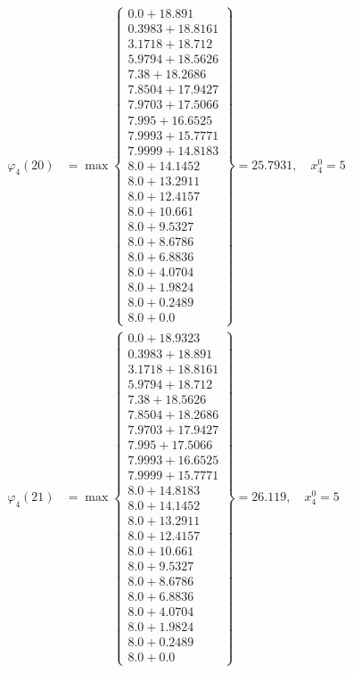\documentclass{article}
\begin{document}
\begin{align*}
\varphi_{4}(20) &= \max \left\{ \begin{array}{c}
0.0 + 18.891 \\
 0.3983 + 18.8161 \\
 3.1718 + 18.712 \\
 5.9794 + 18.5626 \\
 7.38 + 18.2686 \\
 7.8504 + 17.9427 \\
 7.9703 + 17.5066 \\
 7.995 + 16.6525 \\
 7.9993 + 15.7771 \\
 7.9999 + 14.8183 \\
 8.0 + 14.1452 \\
 8.0 + 13.2911 \\
 8.0 + 12.4157 \\
 8.0 + 10.661 \\
 8.0 + 9.5327 \\
 8.0 + 8.6786 \\
 8.0 + 6.8836 \\
 8.0 + 4.0704 \\
 8.0 + 1.9824 \\
 8.0 + 0.2489 \\
 8.0 + 0.0
\end{array} \right\}=25.7931, \quad x_{4}^0=5\\
  
\varphi_{4}(21) &= \max \left\{ \begin{array}{c}
0.0 + 18.9323 \\
 0.3983 + 18.891 \\
 3.1718 + 18.8161 \\
 5.9794 + 18.712 \\
 7.38 + 18.5626 \\
 7.8504 + 18.2686 \\
 7.9703 + 17.9427 \\
 7.995 + 17.5066 \\
 7.9993 + 16.6525 \\
 7.9999 + 15.7771 \\
 8.0 + 14.8183 \\
 8.0 + 14.1452 \\
 8.0 + 13.2911 \\
 8.0 + 12.4157 \\
 8.0 + 10.661 \\
 8.0 + 9.5327 \\
 8.0 + 8.6786 \\
 8.0 + 6.8836 \\
 8.0 + 4.0704 \\
 8.0 + 1.9824 \\
 8.0 + 0.2489 \\
 8.0 + 0.0
\end{array} \right\}=26.119, \quad x_{4}^0=5\\
  

\end{align*}
\end{document}

